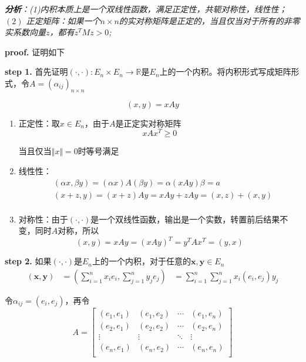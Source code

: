 \textsl{\textbf{分析}：(1)内积本质上是一个双线性函数，满足正定性，共轭对称性，线性性；$(2)$ 正定矩阵：如果一个$n\times n$的实对称矩阵是正定的，当且仅当对于所有的非零实系数向量$z$，都有$z^TMz>0$;}

\textbf{proof.} 证明如下

\textbf{step 1.} 首先证明$(\cdot,\cdot):E_n\times E_n\rightarrow \mathbb{R}$是$E_n$上的一个内积。将内积形式写成矩阵形式，令$A=(\alpha_{ij})_{n\times n}$

\begin{equation}
    (x,y)=xAy
\end{equation}

\begin{enumerate}[itemindent=2em]
    \item 正定性：取$x\in E_n$，由于$A$是正定实对称矩阵
    \begin{equation}
        xAx^T\geqslant 0
    \end{equation}

    当且仅当$\Vert x\Vert=0$时等号满足
    \item 线性性：
    \begin{equation}
        \begin{aligned}
            & (\alpha x,\beta y)=(\alpha x)A(\beta y)=\alpha(xAy)\beta=a\\
            & (x+z,y)=(x+z)Ay=xAy+zAy=(x,z)+(x,y)\\
        \end{aligned}
    \end{equation}
    \item 对称性：由于$(\cdot,\cdot)$是一个双线性函数，输出是一个实数，转置前后结果不变，同时$A$对称，所以
    \begin{equation}
        (x,y)=xAy=(xAy)^T=y^TAx^T=(y,x)
    \end{equation}
\end{enumerate}

\textbf{step 2.} 如果$(\cdot,\cdot)$是$E_n$上的一个内积，对于任意的$\mathbf{x},\mathbf{y}\in E_n$
\begin{equation}
    \begin{aligned}
        (\mathbf{x},\mathbf{y})&=(\sum_{i=1}^{n}x_ie_i,\sum_{j=1}^{n}y_je_j)
        &=\sum_{i=1}^{n}\sum_{j=1}^{n}x_i(e_i,e_j)y_j
    \end{aligned}
\end{equation}

令$\alpha_{ij}=(e_i,e_j)$，再令
\begin{equation}
    A=\left[
        \begin{array}{ccccc}
            (e_1,e_1) & (e_1,e_2) & \cdots & (e_1,e_n) \\
            (e_2,e_1) & (e_2,e_2) & \cdots & (e_2,e_n) \\
            \vdots    & \vdots    & \ddots & \vdots    \\
            (e_n,e_1) & (e_n,e_2) & \cdots & (e_n,e_n) \\
        \end{array}
    \right]
\end{equation}

